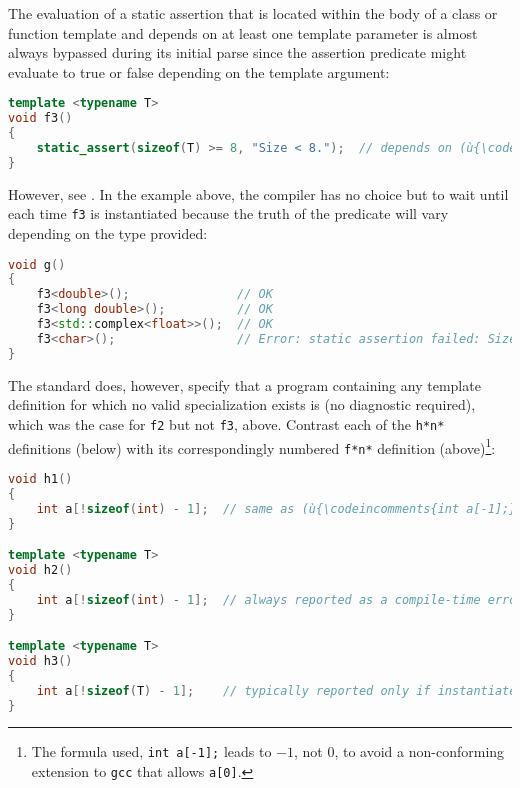 \noindent The evaluation of a static assertion that is located within the
body of a class or function template and depends on at least one
template parameter is almost always bypassed during its initial parse since
the assertion predicate might evaluate to true or false depending on the template argument:

\begin{lstlisting}[language=C++]
template <typename T>
void f3()
{
    static_assert(sizeof(T) >= 8, "Size < 8.");  // depends on (ù{\codeincomments{T}}ù)
}
\end{lstlisting}
    
\noindent However, see 
.
In the example above, the compiler has no choice but to wait until each
time \lstinline!f3! is instantiated because the truth of the predicate will
vary depending on the type provided:

\begin{lstlisting}[language=C++]
void g()
{
    f3<double>();               // OK
    f3<long double>();          // OK
    f3<std::complex<float>>();  // OK
    f3<char>();                 // Error: static assertion failed: Size < 8.
}
\end{lstlisting}
    
\noindent The standard does, however, specify that a program containing any
template definition for which no valid specialization exists is
 (no diagnostic required), which was the case for
\lstinline!f2! but not \lstinline!f3!, above. Contrast each of the
\lstinline!h*!\lstinline[basicstyle=\ttfamily\itshape]!n!\lstinline!*! definitions (below) with its correspondingly numbered
\lstinline!f*!\lstinline[basicstyle=\ttfamily\itshape]!n!\lstinline!*!  definition (above)\footnote{The formula used, \lstinline!int!~\lstinline!a[-1];! leads to $-1$, not $0$, to avoid a non-conforming extension to \lstinline!gcc! that allows \lstinline!a[0]!.}:

\begin{lstlisting}[language=C++]
void h1()
{
    int a[!sizeof(int) - 1];  // same as (ù{\codeincomments{int a[-1];}}ù) and is ill formed
}

template <typename T>
void h2()
{
    int a[!sizeof(int) - 1];  // always reported as a compile-time error
}

template <typename T>
void h3()
{
    int a[!sizeof(T) - 1];    // typically reported only if instantiated
}
\end{lstlisting}
    

